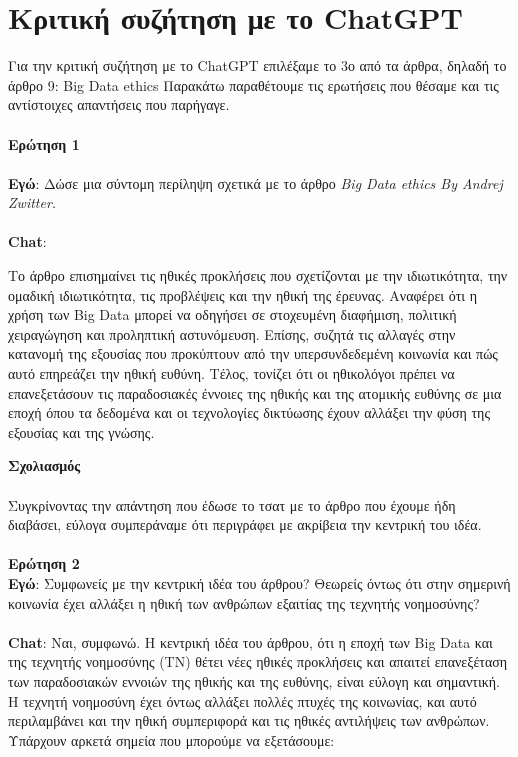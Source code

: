 \documentclass{report}
\begin{document}
\section{Κριτική συζήτηση με το ChatGPT}
Για την κριτική συζήτηση με το ChatGPT επιλέξαμε το 3ο από τα άρθρα, δηλαδή το άρθρο 9: Big Data ethics
Παρακάτω παραθέτουμε τις ερωτήσεις που θέσαμε και τις αντίστοιχες απαντήσεις που παρήγαγε.\\\\

\textbf{Ερώτηση 1}\\\\
\textbf{Εγώ}: Δώσε μια σύντομη περίληψη σχετικά με το άρθρο  \textit{Big Data ethics By Andrej Zwitter. } \\\\
\textbf{Chat}:
 
Το άρθρο επισημαίνει τις ηθικές προκλήσεις που σχετίζονται με την ιδιωτικότητα, την ομαδική ιδιωτικότητα, τις προβλέψεις και την ηθική της έρευνας. Αναφέρει ότι η χρήση των Big Data μπορεί να οδηγήσει σε στοχευμένη διαφήμιση, πολιτική χειραγώγηση και προληπτική αστυνόμευση. Επίσης, συζητά τις αλλαγές στην κατανομή της εξουσίας που προκύπτουν από την υπερσυνδεδεμένη κοινωνία και πώς αυτό επηρεάζει την ηθική ευθύνη.
Τέλος, τονίζει ότι οι ηθικολόγοι πρέπει να επανεξετάσουν τις παραδοσιακές έννοιες της ηθικής και της ατομικής ευθύνης σε μια εποχή όπου τα δεδομένα και οι τεχνολογίες δικτύωσης έχουν αλλάξει την φύση της εξουσίας και της γνώσης.

\textbf{Σχολιασμός}\\\\
Συγκρίνοντας την απάντηση που έδωσε το τσατ με το άρθρο που έχουμε ήδη διαβάσει, εύλογα συμπεράναμε ότι περιγράφει με ακρίβεια την κεντρική του ιδέα.\\\\


\textbf{Ερώτηση 2}\\
\textbf{Εγώ}: Συμφωνείς με την κεντρική ιδέα του άρθρου? Θεωρείς όντως ότι στην σημερινή κοινωνία έχει αλλάξει η ηθική των ανθρώπων εξαιτίας της τεχνητής νοημοσύνης?\\\\
\textbf{Chat}:
Ναι, συμφωνώ. Η κεντρική ιδέα του άρθρου, ότι η εποχή των Big Data και της τεχνητής νοημοσύνης (ΤΝ) θέτει νέες ηθικές προκλήσεις και απαιτεί επανεξέταση των παραδοσιακών εννοιών της ηθικής και της ευθύνης, είναι εύλογη και σημαντική. Η τεχνητή νοημοσύνη έχει όντως αλλάξει πολλές πτυχές της κοινωνίας, και αυτό περιλαμβάνει και την ηθική συμπεριφορά και τις ηθικές αντιλήψεις των ανθρώπων. Υπάρχουν αρκετά σημεία που μπορούμε να εξετάσουμε:
\end{document}
